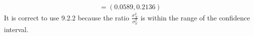 \documentclass{uofa-eng-assignment}
\begin{document}
\begin{enumerate}
\begin{align*}
             & = (0.0589, 0.2136)
        \end{align*}
        It is correct to use 9.2.2 because the ratio $\frac{\sigma_X^2}{\sigma_Y^2}$ is within the range of the confidence interval.
\end{enumerate}
\end{document}

